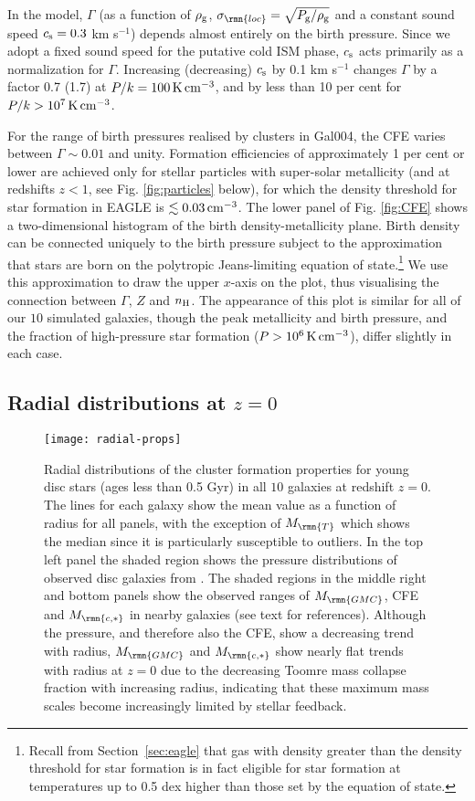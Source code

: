 \documentclass[fleqn,usenatbib]{mnras}
\newcommand{\numgal}{10}
\newcommand{\K}              {\,{\rm K}}
\newcommand{\cmcubed}              {\,{\rm cm}^{-3}}
\newcommand{\Mcstar}{M_\rmn{c,\ast}}
\newcommand{\Mtoomre}{M_\rmn{T}}
\newcommand{\Mgmc}{M_\rmn{GMC}}
\begin{document}
In the \citet{Kruijssen_12} model, $\Gamma$ (as a function of $\rho_{\rm g}$, $\sigma_\rmn{loc} = \sqrt{P_{\rm g}/\rho_{\rm g}}$ and a constant sound speed $c_{\rm s} = 0.3$ km s$^{-1}$) depends almost entirely on the birth pressure. Since we adopt a fixed sound speed for the putative cold ISM phase, $c_{\rm s}$ acts primarily as a normalization for $\Gamma$. Increasing (decreasing) $c_{\rm s}$ by 0.1 km s$^{-1}$ changes $\Gamma$ by a factor 0.7 (1.7) at $P/k = 100 \K \cmcubed$, and by less than 10 per cent for $P/k > 10^7 \K \cmcubed$. 

For the range of birth pressures realised by clusters in Gal004, the CFE varies between $\Gamma \sim 0.01$ and unity. Formation efficiencies of approximately 1 per cent or lower are achieved only for stellar particles with super-solar metallicity (and at redshifts $z < 1$, see Fig. \ref{fig:particles} below), for which the density threshold for star formation in EAGLE is $\lesssim 0.03 \cmcubed$. The lower panel of Fig. \ref{fig:CFE} shows a two-dimensional histogram of the birth density-metallicity plane. Birth density can be connected uniquely to the birth pressure subject to the approximation that stars are born on the polytropic Jeans-limiting equation of state.\footnote{Recall from Section~\ref{sec:eagle} that gas with density greater than the density threshold for star formation is in fact eligible for star formation at temperatures up to 0.5 dex higher than those set by the equation of state.} We use this approximation to draw the upper $x$-axis on the plot, thus visualising the connection between $\Gamma$, $Z$ and $n_{\rm H}$. The appearance of this plot is similar for all of our $\numgal$ simulated galaxies, though the peak metallicity and birth pressure, and the fraction of high-pressure star formation ($P>10^6 \K \cmcubed$), differ slightly in each case.


\subsection{Radial distributions at $z=0$}

\begin{figure*}
  \texttt{[image: radial-props]}
  \caption{Radial distributions of the cluster formation properties for young disc stars (ages less than 0.5 Gyr) in all $\numgal$ galaxies at redshift $z=0$. The lines for each galaxy show the mean value as a function of radius for all panels, with the exception of $\Mtoomre$ which shows the median since it is particularly susceptible to outliers. In the top left panel the shaded region shows the pressure distributions of observed disc galaxies from \citet[assuming hydrostatic equilibrium, see text]{Leroy_et_al_08}. The shaded regions in the middle right and bottom panels show the observed ranges of $\Mgmc$, CFE and $\Mcstar$ in nearby galaxies (see text for references). Although the pressure, and therefore also the CFE, show a decreasing trend with radius, $\Mgmc$ and $\Mcstar$ show nearly flat trends with radius at $z=0$ due to the decreasing Toomre mass collapse fraction with increasing radius, indicating that these maximum mass scales become increasingly limited by stellar feedback.}
  \label{fig:radial_props}
\end{figure*}
\end{document}
